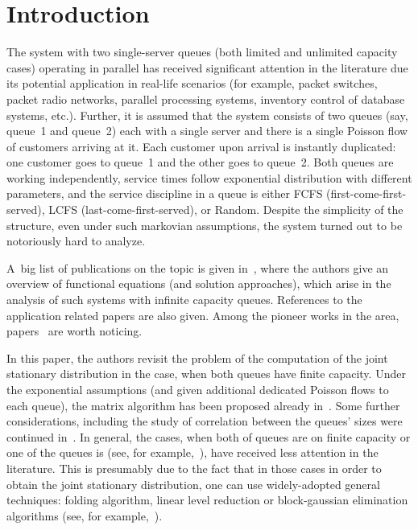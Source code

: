       \begin{multicols}{2}

                  \label{st\stat}

\section{Introduction}

\noindent
The system with two single-server queues (both limited and unlimited capacity
cases) operating in parallel has received significant attention in the literature
due its potential application in real-life scenarios
(for example, packet switches, packet radio networks, parallel processing systems,
inventory control of database systems, etc.). Further, it is assumed that the system consists of 
two queues (say, queue~1 and queue~2) each with a single server
and there is a single Poisson flow of customers arriving at it. 
Each customer upon arrival is instantly duplicated: one customer goes 
to queue~1 and the other goes to queue~2. Both queues are working independently,
service times follow exponential distribution with different parameters,
and the service discipline in a queue is either FCFS (first-come-first-served), 
LCFS (last-come-first-served), or Random. 
Despite the simplicity of the structure, even under such markovian assumptions, 
the system turned out to be notoriously hard to analyze.

A~big list of publications on the topic is given in~\cite{intro1},
where the authors give an overview of functional equations (and solution approaches), 
which arise in the analysis of such systems with infinite capacity queues. 
References to the application 
related papers are also given. Among the pioneer works in the 
area, papers~\cite{orig1,intro2,orig2-1,orig2-2} are worth noticing.

In this paper, the authors revisit the problem of the computation 
of the joint stationary distribution in the case, when
both queues have finite capacity. 
Under the exponential assumptions (and given additional dedicated Poisson flows
to each queue), the matrix algorithm
has been proposed already in~\cite{orig1}. Some further considerations,
including the study of correlation between the queues' sizes were 
continued in~\cite{orig2}.
In general, the cases, when both of queues are on finite capacity 
or one of the queues is (see, for example,~\cite{NEW1}), have received less attention 
in the literature. This is presumably due to the fact that in
those cases in order to obtain the joint stationary distribution, one can
use widely-adopted general techniques:
folding algorithm, linear level reduction or 
block-gaussian elimination algorithms
(see, for example,~\cite{lat-ram,bocharov}).


\end{multicols}
